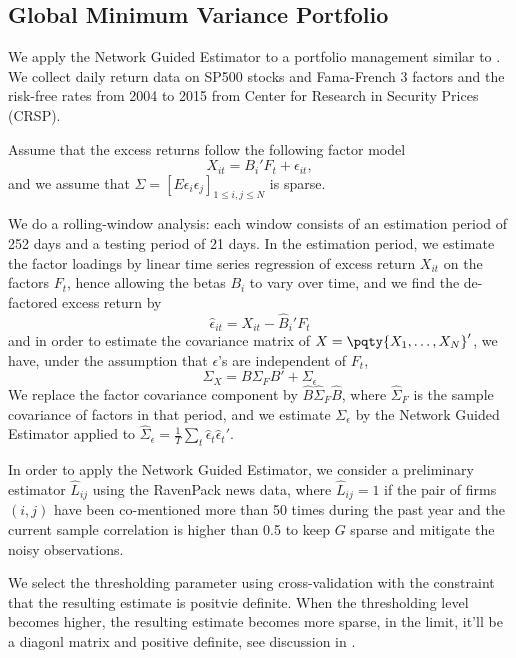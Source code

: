 \subsection{Global Minimum Variance Portfolio}

We apply the Network Guided Estimator to a portfolio management similar to \cite{ledoit2004HoneyShrunk}. We collect daily return data on SP500 stocks and Fama-French 3 factors and the risk-free rates from 2004 to 2015 from Center for Research in Security Prices (CRSP).  

Assume that the excess returns follow the following factor model
\begin{equation*}
    X_{it} = B_{i}'F_{t} + \epsilon_{it},
\end{equation*}
and we assume that \(\Sigma = [E \epsilon_{i} \epsilon_{j}]_{1 \leq i,j\leq N}\) is sparse. 

We do a rolling-window analysis: each window consists of an estimation period of 252 days and a testing period of 21 days. In the estimation period, we estimate the factor loadings by linear time series regression of excess return \(X_{it}\) on the factors \(F_{t}\), hence allowing the betas \(B_{i}\) to vary over time, and we find the de-factored excess return by 
\begin{equation*}
    \hat{\epsilon}_{it} = X_{it} - \hat{B}_{i}'F_{t}
\end{equation*}
and in order to estimate the covariance matrix of \(X = \pqty{X_{1}, \dots, X_{N}}'\), we have, under the assumption that \(\epsilon\)'s are independent of \(F_{t}\), 
\begin{equation*}
    \Sigma_{X} = B \Sigma_{F} B' + \Sigma_{\epsilon}
\end{equation*}
We replace the factor covariance component by \(\hat{B} \hat{\Sigma}_{F} \hat{B}\), where \(\hat{\Sigma}_{F}\) is the sample covariance of factors in that period, and we estimate \(\Sigma_{\epsilon}\) by the Network Guided Estimator applied to \(\hat{\Sigma}_{\epsilon} = \frac{1}{T} \sum_{t}\hat{\epsilon}_{t} \hat{\epsilon}_{t}'\). 

In order to apply the Network Guided Estimator, we consider a preliminary estimator \(\hat{L}_{ij}\) using the RavenPack news data,  where \(\hat{L}_{ij} =1 \) if the pair of firms \((i,j)\) have been co-mentioned more than 50 times during the past year and the current sample correlation is higher than 0.5 to keep \(G\) sparse and mitigate the noisy observations. 

We select the thresholding parameter using cross-validation with the constraint that the resulting estimate is positvie definite. When the thresholding level becomes higher, the resulting estimate becomes more sparse, in the limit, it'll be a diagonl matrix and positive definite, see discussion in \cite{fan2015OverviewEstimation}. 

